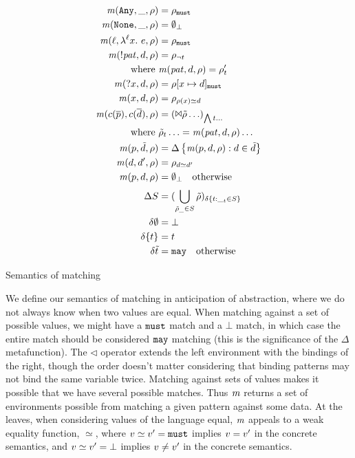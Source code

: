   {\begin{align*}
    \matches(\sany, \_, \menv) &= \menv_\must \\
    \matches(\snone, \_, \menv) &= \emptyset_\bot \\
    \matches(\mtoplevelname, \snlam{\mtoplevelname}{\mvar}{\mexp}, \menv) &= \menv_\must \\
    \matches(\snegpat{\mvpat}, \mdata, \menv) &= \menv_{\neg \mvaluation} \\
    \text{where }& \matches(\mvpat, \mdata, \menv) = \menv'_\mvaluation \\
    \matches(\sbind{\mvar}, \mdata, \menv) &= \menv[\mvar \mapsto \mdata]_\must \\
    \matches(\mvar, \mdata, \menv) &= \menv_{\menv(\mvar) \simeq \mdata} \\
    \matches(\mconstructor(\many{\mpat}), \mconstructor(\many{\mdata}), \menv) &= (\Bowtie \menvs \ldots)_{\bigwedge \mvaluation \ldots} \\
    \text{where }& \menvs_\mvaluation \ldots = \matches(\mvpat, \mdata, \menv) \ldots \\
    \matches(\mpat, \isset{\mdata}, \menv) &= \Delta\setbuild{\matches(\mpat, \mdata, \menv)}{\mdata \in \isset{\mdata}} \\
    \matches(\mdata, \mdata', \menv) &= \menv_{\mdata \simeq \mdata'} \\
    \matches(\mpat, \mdata, \menv) &= \emptyset_\bot \quad
    \text{otherwise}
    \\[2pt]
    \Delta S &= (\bigcup\limits_{\menvs_{\_} \in S}\menvs)_{\delta \setbuild{\mvaluation}{{\_}_\mvaluation \in S}} \\
    \delta \emptyset &= \bot \\
    \delta \setof{\mvaluation} &= \mvaluation \\
    \delta \isset{t} &= \may \quad \text{otherwise}
  \end{align*}}{\caption{Semantics of matching}\label{fig:matchsem}}

We define our semantics of matching in anticipation of abstraction, where we do not always know when two values are equal.
%
When matching against a set of possible values, we might have a ${\tt must}$ match and a $\bot$ match, in which case the entire match should be considered ${\tt may}$ matching (this is the significance of the $\Delta$ metafunction).
%
The $\triangleleft$ operator extends the left environment with the bindings of the right, though the order doesn't matter considering that binding patterns may not bind the same variable twice.
%
Matching against sets of values makes it possible that we have several possible matches.
%
Thus $\mathit{m}$ returns a set of environments possible from matching a given pattern against some data.
%
At the leaves, when considering values of the language equal, $\mathit{m}$ appeals to a weak equality function, $\simeq$, where $v \simeq v' = {\tt must}$ implies $v = v'$ in the concrete semantics, and $v \simeq v' = \bot$ implies $v \neq v'$ in the concrete semantics.

